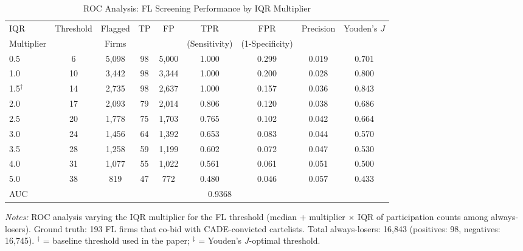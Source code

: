 \begin{table}[htbp]
\centering
\caption{ROC Analysis: FL Screening Performance by IQR Multiplier}
\label{tab:roc_detection}
\begin{adjustbox}{max width=\textwidth}
\begin{threeparttable}
\small
\begin{tabular}{lcccccccc}
\toprule
IQR & Threshold & Flagged & TP & FP & TPR & FPR & Precision & Youden's $J$ \\
Multiplier & & Firms & & & (Sensitivity) & (1-Specificity) & & \\
\midrule
0.5 & 6 & 5,098 & 98 & 5,000 & 1.000 & 0.299 & 0.019 & 0.701 \\
1.0 & 10 & 3,442 & 98 & 3,344 & 1.000 & 0.200 & 0.028 & 0.800 \\
1.5$^{\dagger}$ & 14 & 2,735 & 98 & 2,637 & 1.000 & 0.157 & 0.036 & 0.843 \\
2.0 & 17 & 2,093 & 79 & 2,014 & 0.806 & 0.120 & 0.038 & 0.686 \\
2.5 & 20 & 1,778 & 75 & 1,703 & 0.765 & 0.102 & 0.042 & 0.664 \\
3.0 & 24 & 1,456 & 64 & 1,392 & 0.653 & 0.083 & 0.044 & 0.570 \\
3.5 & 28 & 1,258 & 59 & 1,199 & 0.602 & 0.072 & 0.047 & 0.530 \\
4.0 & 31 & 1,077 & 55 & 1,022 & 0.561 & 0.061 & 0.051 & 0.500 \\
5.0 & 38 & 819 & 47 & 772 & 0.480 & 0.046 & 0.057 & 0.433 \\
\midrule
AUC & \multicolumn{8}{c}{0.9368} \\
\bottomrule
\end{tabular}
\begin{tablenotes}
\small
\item \textit{Notes:} ROC analysis varying the IQR multiplier for the FL
threshold (median + multiplier $\times$ IQR of participation counts among
always-losers). Ground truth: 193 FL firms that co-bid with CADE-convicted
cartelists. Total always-losers: 16,843 (positives: 98,
negatives: 16,745).
$^{\dagger}$ = baseline threshold used in the paper;
$^{\ddagger}$ = Youden's $J$-optimal threshold.
\end{tablenotes}
\end{threeparttable}
\end{adjustbox}
\end{table}